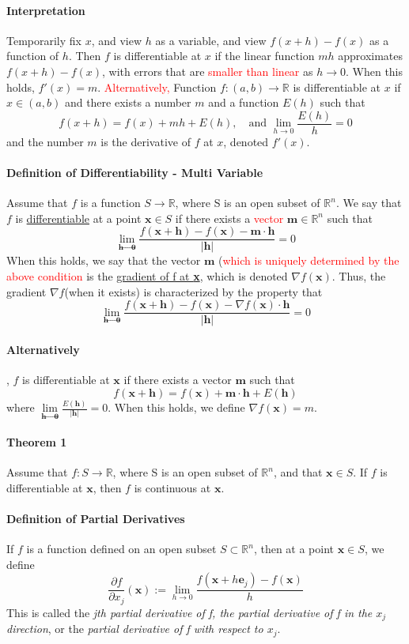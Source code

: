 \documentclass[11pt]{article}
\newcommand{\ti}[1]{\textit{#1}}
\newcommand{\tb}[1]{\textbf{#1}}
\newcommand{\real}[0]{\mathbb{R}}
\newcommand{\under}[1]{\underline{#1}}
\newcommand{\vx}[0]{\tb{x}}
\newcommand{\vo}[0]{\tb{0}}
\newcommand{\ve}[0]{\tb{e}}
\newcommand{\vm}[0]{\tb{m}}
\newcommand{\vh}[0]{\tb{h}}
\newcommand{\p}[0]{\partial}
\begin{document}
\paragraph{Interpretation}
Temporarily fix $x$, and view $h$ as a variable, and view $f(x+h) - f(x)$ as a function of $h$. Then $f$ is differentiable at $x$ if the linear function $mh$ approximates $f(x+h) - f(x)$, with errors that are \textcolor{red}{smaller than linear} as $h \rightarrow 0$. When this holds, $f'(x) = m$.
\textcolor{red}{Alternatively,}
Function $f: (a,b) \rightarrow \real$ is differentiable at $x$ if $x \in (a,b)$ and there exists a number $m$ and a function $E(h)$ such that
$$f(x+h) = f(x) + mh + E(h), \quad \mbox{and } \underset{h\rightarrow 0}{\lim}\frac{E(h)}{h} = 0$$
and the number $m$ is the derivative of $f$ at $x$, denoted $f'(x)$.
\paragraph{Definition of Differentiability - Multi Variable}
Assume that $f$ is a function $S \rightarrow \real$, where S is an open subset of $\real^n$. We say that $f$ is \under{differentiable} at a point $\vx \in S$ if there exists a \textcolor{red}{vector} $\vm \in \real^n$ such that
$$ \underset{\vh \rightarrow \vo}{\lim} \frac{f(\vx + \vh) - f(\vx) - \vm\cdot \vh}{|\vh|} = 0$$
When this holds, we say that the vector $\vm$ (\textcolor{red}{which is uniquely determined by the above condition} is the \under{gradient of f at \vx}, which is denoted $\nabla f(\vx)$. Thus, the gradient $\nabla f$(when it exists) is characterized by the property that
$$ \underset{\vh \rightarrow \vo}{\lim} \frac{f(\vx + \vh) - f(\vx) - \nabla f(\vx)\cdot \vh}{|\vh|} = 0$$
\paragraph{Alternatively}, $f$ is differentiable at $\vx$ if there exists a vector $\vm$ such that
$$f(\vx + \vh) = f(\vx) + \vm \cdot \vh + E(\vh)$$
where $\underset{\vh \rightarrow \vo}{\lim} \frac{E(\vh)}{|\vh|} = 0$.
When this holds, we define $\nabla f(\vx) = m$.
\paragraph{Theorem 1} Assume that $f: S \rightarrow \real$, where S is an open subset of $\real^n$, and that $\vx \in S$. If $f$ is differentiable at $\vx$, then $f$ is continuous at $\vx$.
\paragraph{Definition of Partial Derivatives}
If $f$ is a function defined on an open subset $S \subset \real^n$, then at a point $\vx \in S$, we define $$\frac{\p f}{\p x_j}(\vx) := \underset{h \rightarrow 0}{\lim} \frac{f(\vx+h\ve_j) - f(\vx)}{h}$$
This is called the \ti{jth partial derivative of f, the partial derivative of f in the $x_j$ direction}, or the \ti{partial derivative of f with respect to $x_j$}.
\end{document}
